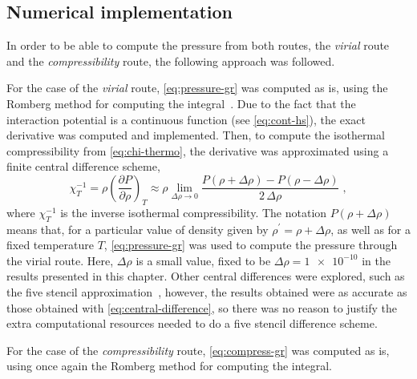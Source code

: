 \subsection{Numerical implementation}
In order to be able to compute the pressure from both routes, the \emph{virial} route and the \emph{compressibility} route, the following approach was followed.

For the case of the \emph{virial} route, \autoref{eq:pressure-gr} was computed as is, using 
the Romberg method for computing the integral~\cite{hammingNumericalMethodsScientists2012}. 
Due to the fact that the interaction potential is a continuous function (see 
\autoref{eq:cont-hs}), the exact derivative was computed and implemented. Then, to compute 
the isothermal compressibility from \autoref{eq:chi-thermo}, the derivative was 
approximated using a finite central difference scheme,
\begin{equation}
    \chi_{T}^{-1} = \rho { \left( \frac{\partial P}{\partial \rho} \right) }_{T}
    \approx \rho \lim_{\Delta \rho \to 0} \frac{P(\rho + \Delta \rho) - P(\rho - \Delta \rho)}{2 \, \Delta \rho}
    \; ,
    \label{eq:central-difference}
\end{equation}
where \(\chi_{T}^{-1}\) is the inverse isothermal compressibility. The notation 
\(P(\rho + \Delta \rho)\) means that, for a particular value of density given by 
\(\rho^{\prime}=\rho + \Delta \rho\), as well as for a fixed temperature \(T\), 
\autoref{eq:pressure-gr} was used to compute the 
pressure through the virial route. Here, \(\Delta \rho\) is a small value, fixed to be
\(\Delta \rho=\num{1e-10}\) in the results presented in this chapter. Other central 
differences were explored, such as the five stencil 
approximation~\cite{hammingNumericalMethodsScientists2012}, however, the results obtained 
were as accurate as those obtained with \autoref{eq:central-difference}, so there was no 
reason to justify the extra computational resources needed to do a five stencil difference 
scheme.

For the case of the \emph{compressibility} route, \autoref{eq:compress-gr} was computed as 
is, using once again the Romberg method for computing the integral.

